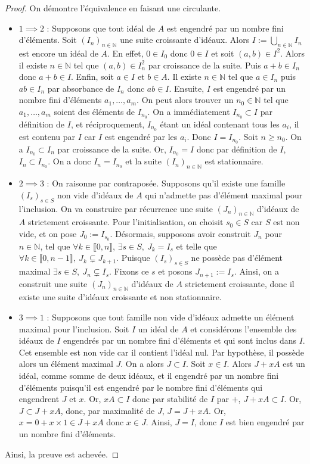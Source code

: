 \documentclass[french]{book}
\newcommand{\N}{\mathbb{N}}
\theoremstyle{plain}
\theoremstyle{definition}
\theoremstyle{remark}
\begin{document}
\begin{proof} 
	On démontre l'équivalence en faisant une circulante.
	\begin{itemize}
		\item $1\implies2$ : Supposons que tout idéal de $A$ est engendré par un nombre fini d'éléments. Soit $(I_n)_{n\in\N}$ une suite croissante d'idéaux. Alors $I:=\displaystyle\bigcup_{n\in\N}I_n$ est encore un idéal de $A$. En effet, $0\in I_0$ donc $0\in I$ et soit $(a,b)\in I^2$. Alors il existe $n\in\N$ tel que $(a,b)\in I_n^2$ par croissance de la suite. Puis $a+b\in I_n$ donc $a+b\in I$. Enfin, soit $a\in I$ et $b\in A$. Il existe $n\in\N$ tel que $a\in I_n$ puis $ab\in I_n$ par absorbance de $I_n$ donc $ab\in I$. Ensuite, $I$ est engendré par un nombre fini d'éléments $a_1,\ldots,a_m$. On peut alors trouver un $n_0\in\N$ tel que $a_1,\ldots,a_m$ soient des éléments de $I_{n_0}$. On a immédiatement $I_{n_0}\subset I$ par définition de $I$, et réciproquement, $I_{n_0}$ étant un idéal contenant tous les $a_i$, il est contenu par $I$ car $I$ est engendré par les $a_i$. Donc $I=I_{n_0}$. Soit $n\geqslant n_0$. On a $I_{n_0}\subset I_n$ par croissance de la suite. Or, $I_{n_0}=I$ donc par définition de $I$, $I_n\subset I_{n_0}$. On a donc $I_n=I_{n_0}$ et la suite $(I_n)_{n\in\N}$ est stationnaire.
		\item $2\implies3$ : On raisonne par contraposée. Supposons qu'il existe une famille $(I_s)_{s\in S}$ non vide d'idéaux de $A$ qui n'admette pas d'élément maximal pour l'inclusion. On va construire par récurrence une suite $(J_n)_{n\in\N}$ d'idéaux de $A$ strictement croissante. Pour l'initialisation, on choisit $s_0\in S$ car $S$ est non vide, et on pose $J_0:=I_{s_0}$. Désormais, supposons avoir construit $J_n$ pour $n\in\N$, tel que $\forall k\in\llbracket0,n\rrbracket$, $\exists s\in S,\ J_k=I_s$ et telle que $\forall k\in\llbracket0,n-1\rrbracket,\ J_k\subsetneq J_{k+1}$. Puisque $(I_s)_{s\in S}$ ne possède pas d'élément maximal $\exists s\in S,\ J_n\subsetneq I_s$. Fixons ce $s$ et posons $J_{n+1}:=I_s$. Ainsi, on a construit une suite $(J_n)_{n\in\N}$ d'idéaux de $A$ strictement croissante, donc il existe une suite d'idéaux croissante et non stationnaire.
		\item $3\implies1$ : Supposons que tout famille non vide d'idéaux admette un élément maximal pour l'inclusion. Soit $I$ un idéal de $A$ et considérons l'ensemble des idéaux de $I$ engendrés par un nombre fini d'éléments et qui sont inclus dans $I$. Cet ensemble est non vide car il contient l'idéal nul. Par hypothèse, il possède alors un élément maximal $J$. On a alors $J\subset I$. Soit $x\in I$. Alors $J+xA$ est un idéal, comme somme de deux idéaux, et il engendré par un nombre fini d'éléments puisqu'il est engendré par le nombre fini d'éléments qui engendrent $J$ et $x$. Or, $xA\subset I$ donc par stabilité de $I$ par $+$, $J+xA\subset I$. Or, $J\subset J+xA$, donc, par maximalité de $J$, $J=J+xA$. Or, $x=0+x\times 1\in J+xA$ donc $x\in J$. Ainsi, $J=I$, donc $I$ est bien engendré par un nombre fini d'éléments.
	\end{itemize}
	Ainsi, la preuve est achevée.
\end{proof}
\end{document}
